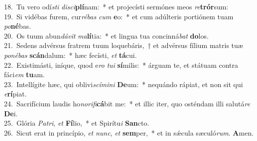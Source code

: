 {18.~}Tu vero odí\textit{sti} \textit{di}\textit{sci}\textbf{plí}nam:~* et projecísti sermónes meos \textit{re}\textbf{trór}sum:\\
{19.~}Si vidébas furem, cur\textit{ré}\textit{bas} \textit{cum} \textbf{e}o:~* et cum adúlteris portiónem tuam \textit{po}\textbf{né}bas.\\
{20.~}Os tuum abun\textit{dá}\textit{vit} \textit{ma}\textbf{lí}tia:~* et lingua tua concinná\textit{bat} \textbf{do}los.\\
{21.~}Sedens advérsus fratrem tuum loquebáris,~† et advérsus fílium matris tuæ \textit{po}\textit{né}\textit{bas} \textbf{scán}dalum:~* hæc fecísti, \textit{et} \textbf{tá}cui.\\
{22.~}Existimásti, iníque, quod e\textit{ro} \textit{tu}\textit{i} \textbf{sí}milis:~* árguam te, et státuam contra fáci\textit{em} \textbf{tu}am.\\
{23.~}Intellígite hæc, qui oblivi\textit{scí}\textit{mi}\textit{ni} \textbf{De}um:~* nequándo rápiat, et non sit qui \textit{e}\textbf{rí}piat.\\
{24.~}Sacrifícium laudis ho\textit{no}\textit{ri}\textit{fi}\textbf{cá}bit me:~* et illic iter, quo osténdam illi salutá\textit{re} \textbf{De}i.\\
{25.~}Glória \textit{Pa}\textit{tri}, \textit{et} \textbf{Fí}lio,~* et Spirítu\textit{i} \textbf{San}cto.\\
{26.~}Sicut erat in princípio, \textit{et} \textit{nunc}, \textit{et} \textbf{sem}per,~* et in sǽcula sæculó\textit{rum}. \textbf{A}men.\\
